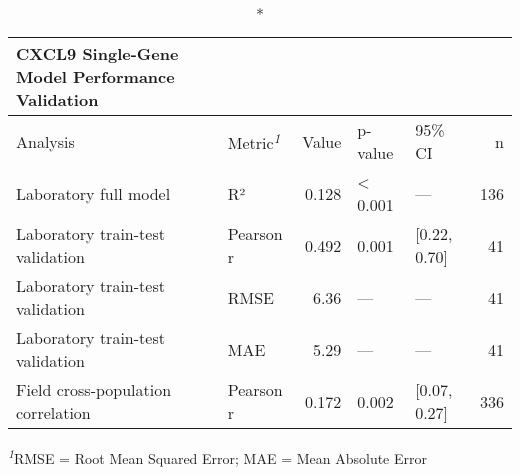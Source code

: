 \setlength{\LTpost}{0mm}
\begin{longtable}{llrllr}
\caption*{
{\large CXCL9 Single-Gene Model Performance Validation}
} \\ 
\toprule
Analysis & Metric\textsuperscript{\textit{1}} & Value & p-value & 95\% CI & n \\ 
\midrule\addlinespace[2.5pt]
Laboratory full model & R² & 0.128 & < 0.001 & — & 136 \\ 
Laboratory train-test validation & Pearson r & 0.492 & 0.001 & [0.22, 0.70] & 41 \\ 
Laboratory train-test validation & RMSE & 6.36 & — & — & 41 \\ 
Laboratory train-test validation & MAE & 5.29 & — & — & 41 \\ 
Field cross-population correlation & Pearson r & 0.172 & 0.002 & [0.07, 0.27] & 336 \\ 
\bottomrule
\end{longtable}
\begin{minipage}{\linewidth}
\textsuperscript{\textit{1}}RMSE = Root Mean Squared Error; MAE = Mean Absolute Error\\
\end{minipage}

